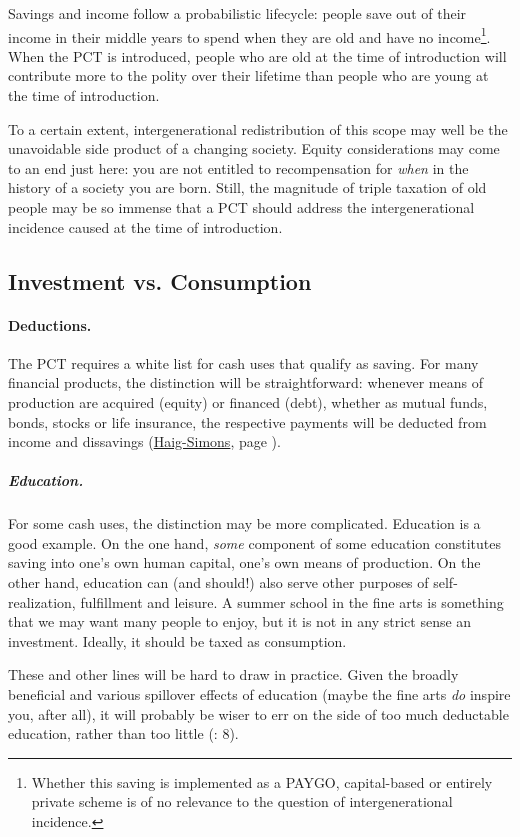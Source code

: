 Savings and income follow a probabilistic lifecycle: people save out of their income in their middle years to spend when they are old and have no income\footnote{
	Whether this saving is implemented as a PAYGO, capital-based or entirely private scheme is of no relevance to the question of intergenerational incidence.}. When the PCT is introduced, people who are old at the time of introduction will contribute more to the polity over their lifetime than people who are young at the time of introduction.

To a certain extent, intergenerational redistribution of this scope may well be the unavoidable side product of a changing society. Equity considerations may come to an end just here: you are not entitled to recompensation for \emph{when} in the history of a society you are born. Still, the magnitude of triple taxation of old people may be so immense that a PCT should address the intergenerational incidence caused at the time of introduction.

\subsection{Investment vs. Consumption}
\paragraph{Deductions.} The PCT requires a white list for cash uses that qualify as saving. For many financial products, the distinction will be straightforward: whenever means of production are acquired (equity) or financed (debt), whether as mutual funds, bonds, stocks or life insurance, the respective payments will be deducted from income and dissavings (\hyperref[eq:HaigSimonsPCT]{Haig-Simons}, page \pageref{eq:HaigSimonsPCT}).

\subparagraph{Education.} For some cash uses, the distinction may be more complicated. Education is a good example. On the one hand, \emph{some} component of some education constitutes saving into one's own human capital, one's own means of production. On the other hand, education can (and should!) also serve other purposes of self-realization, fulfillment and leisure. A summer school in the fine arts is something that we may want many people to enjoy, but it is not in any strict sense an investment. Ideally, it should be taxed as consumption.

These and other lines will be hard to draw in practice. Given the broadly beneficial and various spillover effects of education (maybe the fine arts \emph{do} inspire you, after all), it will probably be wiser to err on the side of too much deductable education, rather than too little (\citealt{Seidman1997}: 8).

